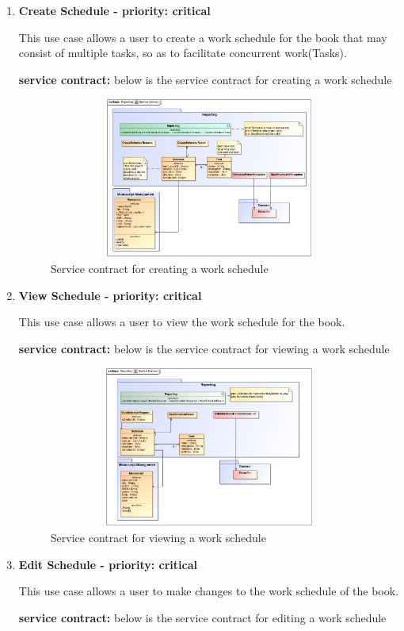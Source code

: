 \begin{enumerate}
\item \textbf{Create Schedule - priority: critical}
\par{This use case allows a user to create a work schedule for the book that may consist of multiple tasks, so as to facilitate concurrent work(Tasks).}
\par{\textbf{service contract:} below is the service contract for creating a work schedule}
\begin{figure}[h]
\includegraphics[height=200px, width=500px]{epsImages/Reporting/createSchedule.eps}
\caption{Service contract for creating a work schedule}
\end{figure}

\item \textbf{View Schedule - priority: critical}
\par{This use case allows a user to view the work schedule for the book.}
\par{\textbf{service contract:} below is the service contract for viewing a work schedule}
\begin{figure}[h]
\includegraphics[height=200px, width=500px]{epsImages/Reporting/viewSchedule.eps}
\caption{Service contract for viewing a work schedule}
\end{figure}

\item \textbf{Edit Schedule - priority: critical}
\par{This use case allows a user to make changes to the work schedule of the book.}
\par{\textbf{service contract:} below is the service contract for editing a work schedule}


\end{enumerate}
